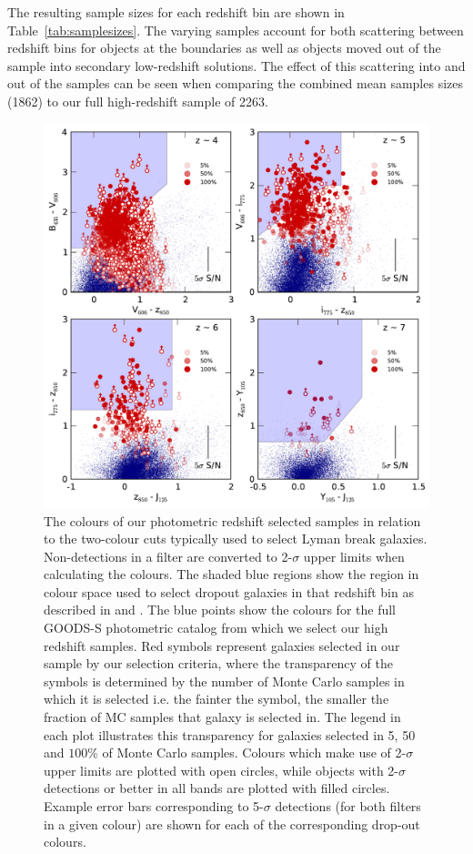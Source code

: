 The resulting sample sizes for each redshift bin are shown in Table~\ref{tab:samplesizes}. The varying samples account for both scattering between redshift bins for objects at the boundaries as well as objects moved out of the sample into secondary low-redshift solutions. The effect of this scattering into and out of the samples can be seen when comparing the combined mean samples sizes (1862) to our full high-redshift sample of 2263.

\begin{figure}
\includegraphics[width=140mm]{plots/fig2.pdf}
\caption[Short caption]{The colours of our photometric redshift selected samples in relation to the two-colour cuts typically used to select Lyman break galaxies. Non-detections in a filter are converted to 2-$\sigma$ upper limits when calculating the colours. The shaded blue regions show the region in colour space used to select dropout galaxies in that redshift bin as described in  \citet{2007ApJ...670..928B} and \citet{2012ApJ...754...83B}. The blue points show the colours for the full GOODS-S photometric catalog from which we select our high redshift samples. Red symbols represent galaxies selected in our sample by our selection criteria, where the transparency of the symbols is determined by the number of Monte Carlo samples in which it is selected i.e. the fainter the symbol, the smaller the fraction of MC samples that galaxy is selected in. The legend in each plot illustrates this transparency for galaxies selected in 5, 50 and $100\%$ of Monte Carlo samples. Colours which make use of 2-$\sigma$ upper limits are plotted with open circles, while objects with 2-$\sigma$ detections or better in all bands are plotted with filled circles. Example error bars corresponding to 5-$\sigma$ detections (for both filters in a given colour) are shown for each of the corresponding drop-out colours.}
\label{fig:colours}
\end{figure}


